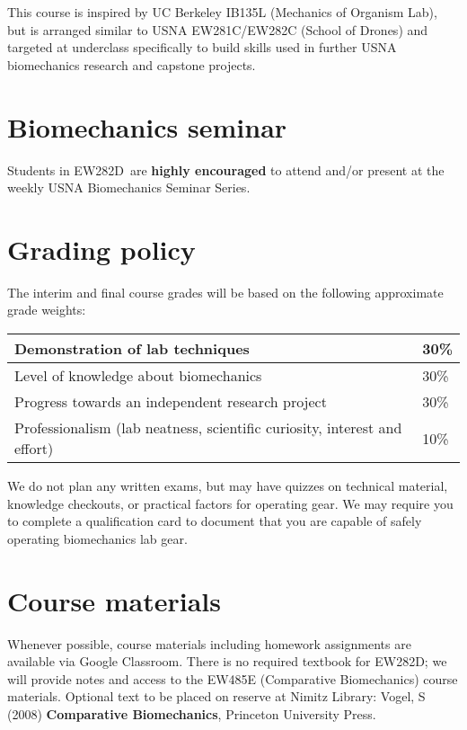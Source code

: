 \documentclass[11pt,courier]{navymemo}
\newcommand{\usnaCourseNumber}{EW282D}
\newcommand{\GoogleClassroom}{Google Classroom}
\begin{document}
This course is inspired by UC Berkeley IB135L (Mechanics of Organism Lab), but is arranged similar to USNA EW281C/EW282C (School of Drones) and targeted at underclass specifically to build skills used in further USNA biomechanics research and capstone projects. 

\section{Biomechanics seminar} Students in \usnaCourseNumber\ are \textbf{highly encouraged} to attend and/or present at the weekly USNA Biomechanics Seminar Series. 
 
\section{Grading policy} The interim and final course grades will be based on the following approximate grade weights:
\begin{table}[h]
\begin{center}
\begin{tabular}{|p{3in}|p{0.5in}|}\hline
Demonstration of lab techniques & 30\% \\\hline
Level of knowledge about biomechanics & 30\% \\ \hline
Progress towards an independent research project & 30\% \\ \hline
Professionalism (lab neatness, scientific curiosity, interest and effort) & 10\% \\ \hline
\end{tabular}
\end{center}
\end{table}

We do not plan any written exams, but may have quizzes on technical material, knowledge checkouts, or practical factors for operating gear. We may require you to complete a qualification card to document that you are capable of safely operating biomechanics lab gear.

\section{Course materials}
Whenever possible, course materials including homework assignments are available via \GoogleClassroom. There is no required textbook for \usnaCourseNumber; we will provide notes and access to the EW485E (Comparative Biomechanics) course materials. Optional text to be placed on reserve at Nimitz Library: Vogel, S (2008) \textbf{Comparative Biomechanics}, Princeton University Press.  
\end{document}
